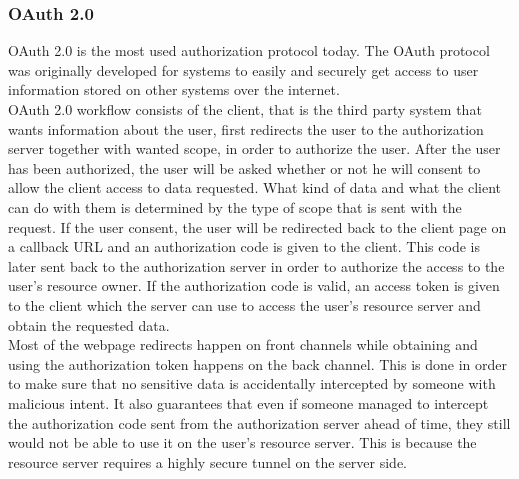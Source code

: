 \subsubsection{OAuth 2.0}
OAuth 2.0\cite{oauthvideo} is the most used authorization protocol today. The OAuth protocol was originally developed for systems to easily and securely get access to user information stored on other systems over the internet.
\\[11pt]
OAuth 2.0 workflow consists of the client, that is the third party system that wants information about the user, first redirects the user to the authorization server together with wanted scope, in order to authorize the user. After the user has been authorized, the user will be asked whether or not he will consent to allow the client access to data requested. What kind of data and what the client can do with them is determined by the type of scope that is sent with the request. If the user consent, the user will be redirected back to the client page on a callback URL and an authorization code is given to the client. This code is later sent back to the authorization server in order to authorize the access to the user's resource owner. If the authorization code is valid, an access token is given to the client which the server can use to access the user's resource server and obtain the requested data.
\\[11pt]
Most of the webpage redirects happen on front channels while obtaining and using the authorization token happens on the back channel. This is done in order to make sure that no sensitive data is accidentally intercepted by someone with malicious intent. It also guarantees that even if someone managed to intercept the authorization code sent from the authorization server ahead of time, they still would not be able to use it on the user's resource server. This is because the resource server requires a highly secure tunnel on the server side.
